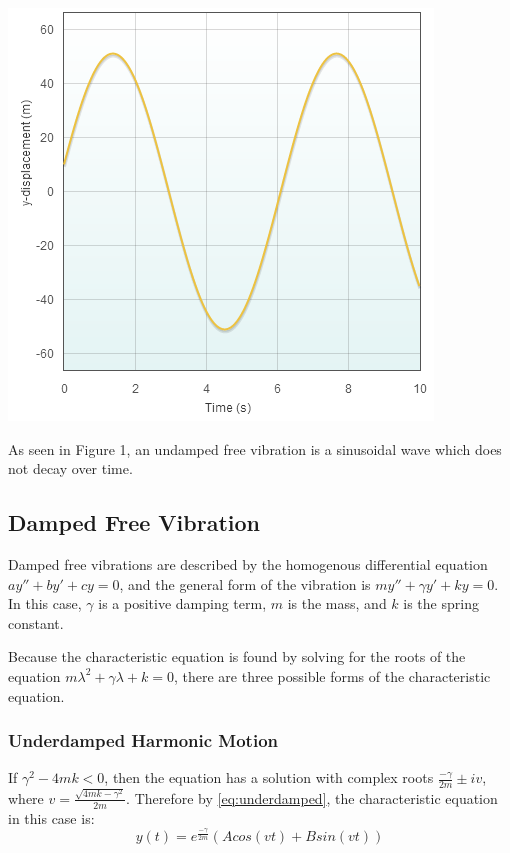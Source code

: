 \documentclass[11pt]{article} %
\newenvironment{Figure}
  {\par\medskip\noindent\minipage{\linewidth}}
  {\endminipage\par\medskip}
\begin{document}
\begin{multicols}{2}
\begin{Figure}
 \centering
 \includegraphics[width=\linewidth]{undamped_free.png}
\end{Figure}

As seen in Figure 1, an undamped free vibration is a sinusoidal wave which does not decay over time. 

\subsection {Damped Free Vibration}
Damped free vibrations are described by the homogenous differential equation $ay'' + by' +cy = 0$, and the general form of the vibration is $my'' + {\gamma}y' + ky = 0$. In this case, $\gamma$ is a positive damping term, $m$ is the mass, and $k$ is the spring constant.

Because the characteristic equation is found by solving for the roots of the equation $m{\lambda}^2 + {\gamma}{\lambda} + k = 0$, there are three possible forms of the characteristic equation.

\subsubsection {Underdamped Harmonic Motion}
If ${\gamma}^2 - 4mk < 0$, then the equation has a solution with complex roots $\frac{-\gamma}{2m} \pm iv$, where $v = \frac{\sqrt{4mk - {\gamma}^2}}{2m}$. Therefore by \eqref{eq:underdamped}, the characteristic equation in this case is:
\begin{equation}
y(t) = e^{{\frac{-\gamma}{2m}}}(Acos(vt) + Bsin(vt))
\end{equation}


\end{multicols}
\end{document}
